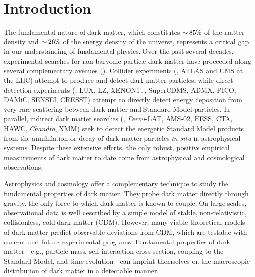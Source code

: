 \chapter{Introduction} 
\label{sec:intro}
\bigskip
{}

The fundamental nature of dark matter, which constitutes $ {\sim}\, 85\%$ of the matter density and $ {\sim}\, 26\%$ of the energy density of the universe, represents a critical gap in our understanding of fundamental physics.
Over the past several decades, experimental searches for non-baryonic particle dark matter have proceeded along several complementary avenues ().
Collider experiments (\eg, ATLAS and CMS at the LHC) attempt to produce and detect dark matter particles, while  %
direct detection experiments (\eg, LUX, LZ, XENON1T, SuperCDMS, ADMX, PICO, DAMiC, SENSEI, CRESST) attempt to directly detect energy deposition from very rare scattering between dark matter and Standard Model particles.
In parallel, indirect dark matter searches (\eg, {\it Fermi}-LAT, AMS-02, HESS, CTA, HAWC, {\it Chandra}, XMM) seek to detect the energetic Standard Model products from the annihilation or decay of dark matter particles {\it in situ} in astrophysical systems. %
Despite these extensive efforts, the only robust, positive empirical measurements of dark matter to date come from astrophysical and cosmological observations. 

Astrophysics and cosmology offer a complementary technique to study the fundamental properties of dark matter. 
They probe dark matter directly through gravity, the only force to which dark matter is known to couple. 
On large scales, observational data is well described by a simple model of stable, non-relativistic, collisionless, cold dark matter (CDM).
However, many viable theoretical models of dark matter predict observable deviations from CDM, which are testable with current and future experimental programs.
Fundamental properties of dark matter---e.g., particle mass, self-interaction cross section, coupling to the Standard Model, and time-evolution---can imprint themselves on the macroscopic distribution of dark matter in a detectable manner.

